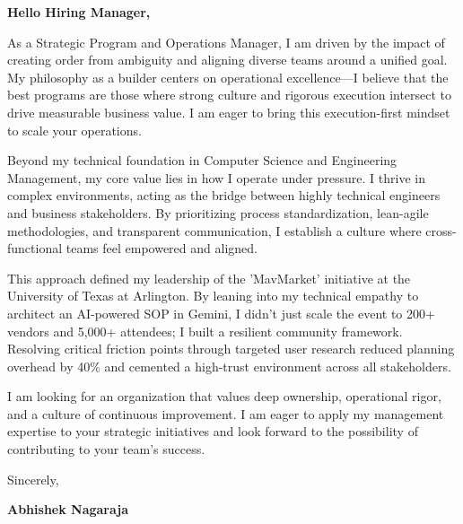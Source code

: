 \documentclass[11pt,letterpaper]{article} %
\begin{document}
\vspace{1.5em}

\textbf{Hello Hiring Manager,}

As a Strategic Program and Operations Manager, I am driven by the impact of creating order from ambiguity and aligning diverse teams around a unified goal. My philosophy as a builder centers on operational excellence—I believe that the best programs are those where strong culture and rigorous execution intersect to drive measurable business value. I am eager to bring this execution-first mindset to scale your operations.

Beyond my technical foundation in Computer Science and Engineering Management, my core value lies in how I operate under pressure. I thrive in complex environments, acting as the bridge between highly technical engineers and business stakeholders. By prioritizing process standardization, lean-agile methodologies, and transparent communication, I establish a culture where cross-functional teams feel empowered and aligned.

This approach defined my leadership of the 'MavMarket' initiative at the University of Texas at Arlington. By leaning into my technical empathy to architect an AI-powered SOP in Gemini, I didn't just scale the event to 200+ vendors and 5,000+ attendees; I built a resilient community framework. Resolving critical friction points through targeted user research reduced planning overhead by 40\% and cemented a high-trust environment across all stakeholders.

I am looking for an organization that values deep ownership, operational rigor, and a culture of continuous improvement. I am eager to apply my management expertise to your strategic initiatives and look forward to the possibility of contributing to your team's success.

\vspace{1.5em}
Sincerely,

\vspace{1.2em} %
\textbf{Abhishek Nagaraja}
\end{document}
